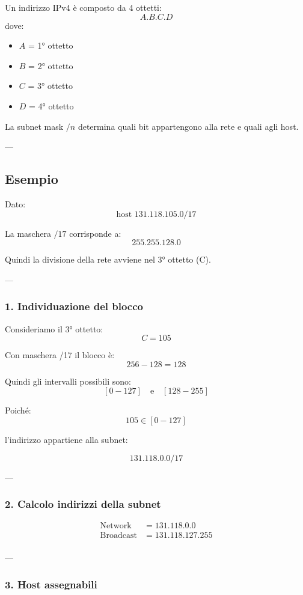 \documentclass[11pt,a4paper]{report}
\begin{document}
Un indirizzo IPv4 è composto da 4 ottetti:
\[
A.B.C.D
\]
dove:
\begin{itemize}
  \item $A$ = 1° ottetto
  \item $B$ = 2° ottetto
  \item $C$ = 3° ottetto
  \item $D$ = 4° ottetto
\end{itemize}

La subnet mask $/n$ determina quali bit appartengono alla rete e quali agli host.

---

\subsection*{Esempio}

Dato:
\[
\text{host } 131.118.105.0/17
\]

La maschera $/17$ corrisponde a:
\[
255.255.128.0
\]

Quindi la divisione della rete avviene nel 3° ottetto (C).

---

\subsubsection*{1. Individuazione del blocco}

Consideriamo il 3° ottetto:
\[
C = 105
\]

Con maschera /17 il blocco è:
\[
256 - 128 = 128
\]

Quindi gli intervalli possibili sono:
\[
[0-127] \quad \text{e} \quad [128-255]
\]

Poiché:
\[
105 \in [0-127]
\]

l'indirizzo appartiene alla subnet:

\[
131.118.0.0/17
\]

---

\subsubsection*{2. Calcolo indirizzi della subnet}

\begin{align*}
\text{Network} &= 131.118.0.0 \\
\text{Broadcast} &= 131.118.127.255 \\
\end{align*}

---

\subsubsection*{3. Host assegnabili}
\end{document}
